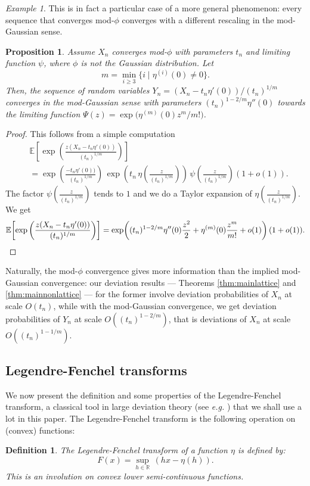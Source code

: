\documentclass[12pt,a4paper,reqno]{amsart}
\newtheorem{proposition}[lemma]{Proposition}
\newtheorem{definition}[lemma]{Definition}
\theoremstyle{remark}
\newtheorem{example}[lemma]{Example}
\newcommand{\R}{\mathbb{R}}
\newcommand{\esper}{\mathbb{E}}
\begin{document}
\begin{example}
This is in fact a particular case of a more general phenomenon:
every sequence that converges mod-$\phi$
converges with a different rescaling in the mod-Gaussian sense.
\begin{proposition}
    Assume $X_n$ converges mod-$\phi$ with parameters $t_n$ and limiting function $\psi$,
    where $\phi$ is not the Gaussian distribution.
    Let 
    \[m = \min_{i \ge 3} \{i \mid \eta^{(i)}(0) \ne 0 \}.\]
    Then, the sequence of random variables $Y_n=(X_n-t_n \eta'(0))/(t_n)^{1/m}$ converges in the mod-Gaussian sense
    with parameters $(t_n)^{1-2/m} \eta''(0)$ towards the limiting function $\Psi(z)=\exp\big(\eta^{(m)}(0) z^m/m!)$.
\end{proposition}
\begin{proof}
    This follows from a simple computation
    \begin{align*}
    &\esper\! \left[  \exp \left( \frac{z (X_n-t_n \eta'(0))}{(t_n)^{1/m}}  \right)\right] \\
    &=\exp\!\left( \frac{-t_n \eta'(0))}{(t_n)^{1/m}} \right) \, \exp \!\left( t_n\, \eta\!\left(\frac{z}{(t_n)^{1/m}}\right) \right)\, \psi\!\left(\frac{z}{(t_n)^{1/m}}\right) (1+o(1)).
    \end{align*}
    The factor $\psi(\frac{z}{(t_n)^{1/m}})$ tends to $1$ and we do a Taylor expansion of $\eta(\frac{z}{(t_n)^{1/m}})$. We get
    \[\esper \!\left[  \exp \left( \frac{z (X_n-t_n \eta'(0))}{(t_n)^{1/m}}  \right)\right]             
        = \exp\!\left( (t_n)^{1-2/m} \eta''(0) \frac{z^2}{2} + \eta^{(m)}(0) \frac{z^m}{m!} + o(1) \right)( 1+o(1)). \qedhere\]
\end{proof}
Naturally, the mod-$\phi$ convergence gives more information than the implied mod-Gaussian convergence:
our deviation results --- Theorems \ref{thm:mainlattice} and \ref{thm:mainnonlattice} ---
for the former involve deviation probabilities of $X_n$ at scale $O(t_n)$,
while with the mod-Gaussian convergence, we get deviation probabilities of $Y_n$ at scale $O((t_n)^{1-2/m})$,
that is deviations of $X_n$ at scale $O((t_n)^{1-1/m})$.
\end{example}
\bigskip



\subsection{Legendre-Fenchel transforms}
We now present the definition and some properties of the Legendre-Fenchel transform, a classical tool in large deviation theory (see \emph{e.g.} \cite[Section 2.2]{DZ98}) that we shall use a lot in this paper. The Legendre-Fenchel transform is the following operation on (convex) functions:
\begin{definition}
The Legendre-Fenchel transform of a function $\eta$ is defined by:
$$F(x)=\sup_{h \in \R}\,( hx-\eta(h)).$$
This is an involution on convex lower semi-continuous functions. 
\end{definition}\medskip
\end{document}
